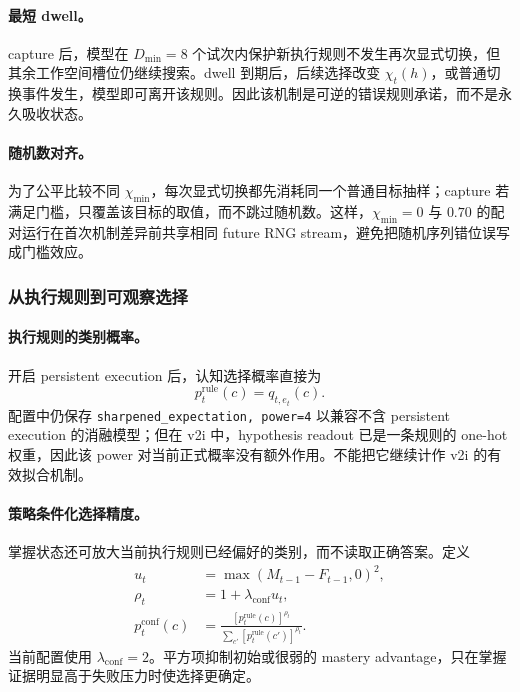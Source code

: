 \paragraph{最短 dwell。}
capture 后，模型在 $D_{\min}=8$ 个试次内保护新执行规则不发生再次显式切换，但其余工作空间槽位仍继续搜索。dwell 到期后，后续选择改变 $\chi_t(h)$，或普通切换事件发生，模型即可离开该规则。因此该机制是可逆的错误规则承诺，而不是永久吸收状态。

\paragraph{随机数对齐。}
为了公平比较不同 $\chi_{\min}$，每次显式切换都先消耗同一个普通目标抽样；capture 若满足门槛，只覆盖该目标的取值，而不跳过随机数。这样，$\chi_{\min}=0$ 与 $0.70$ 的配对运行在首次机制差异前共享相同 future RNG stream，避免把随机序列错位误写成门槛效应。


\subsubsection{从执行规则到可观察选择}

\paragraph{执行规则的类别概率。}
开启 persistent execution 后，认知选择概率直接为
\begin{equation}
p_t^{\mathrm{rule}}(c)=q_{t,e_t}(c).
\label{eq:model0811-executed-choice}
\end{equation}
配置中仍保存
\texttt{sharpened\_expectation, power=4} 以兼容不含 persistent execution 的消融模型；但在 v2i 中，hypothesis readout 已是一条规则的 one-hot 权重，因此该 power 对当前正式概率没有额外作用。不能把它继续计作 v2i 的有效拟合机制。

\paragraph{策略条件化选择精度。}
掌握状态还可放大当前执行规则已经偏好的类别，而不读取正确答案。定义
\begin{align}
u_t&=\max(M_{t-1}-F_{t-1},0)^2,
\nonumber\\
\rho_t&=1+\lambda_{\mathrm{conf}}u_t,
\nonumber\\
p_t^{\mathrm{conf}}(c)
&=
\frac{[p_t^{\mathrm{rule}}(c)]^{\rho_t}}
{\sum_{c'}[p_t^{\mathrm{rule}}(c')]^{\rho_t}}.
\label{eq:model0811-strategy-confidence}
\end{align}
当前配置使用 $\lambda_{\mathrm{conf}}=2$。平方项抑制初始或很弱的 mastery advantage，只在掌握证据明显高于失败压力时使选择更确定。


